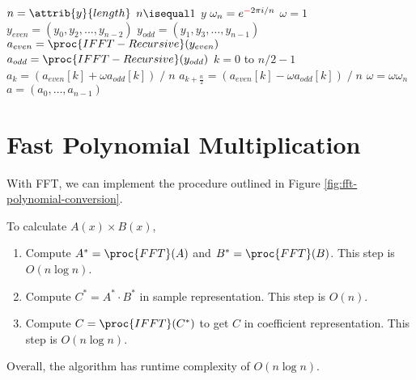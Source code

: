 \begin{codebox}
    \li $n = \attrib{y}{length}$
    \li \If $n \isequal 1$ \Then
        \li \Return $y$ 
    \End
    \li $\omega_n = e^{{\color{red}-}2\pi i/n}$
    \li $\omega = 1$
    \li $y_{even} = (y_0,y_2,\ldots,y_{n-2})$
    \li $y_{odd} = (y_1,y_3,\ldots,y_{n-1})$
    \li $a_{even} = \proc{IFFT-Recursive}(y_{even})$
    \li $a_{odd} = \proc{IFFT-Recursive}(y_{odd})$
    \li \For $k = 0$ to $n/2 - 1$ \Do
        \li $a_k = (a_{even}[k] + \omega a_{odd}[k])\; / \;n$
        \li $a_{k+\frac{n}{2}} = (a_{even}[k] - \omega a_{odd}[k])\; / \;n$
        \li $\omega = \omega \omega_n$
    \End
    \li \Return $a = (a_0,\ldots,a_{n-1})$      
\end{codebox}

\section{Fast Polynomial Multiplication}

With FFT, we can implement the procedure outlined in Figure \ref{fig:fft-polynomial-conversion}.

To calculate $A(x)\times B(x)$,

\begin{enumerate}
    \item Compute $A^* = \proc{FFT}(A)$ and $B^* = \proc{FFT}(B)$. This step is $O(n \log n)$.
    \item Compute $C^* = A^* \cdot B^*$ in sample representation. This step is $O(n)$.
    \item Compute $C = \proc{IFFT}(C^*)$ to get $C$ in coefficient representation. This step is $O(n \log n)$.
\end{enumerate}
Overall, the algorithm has runtime complexity of $O(n \log n)$.